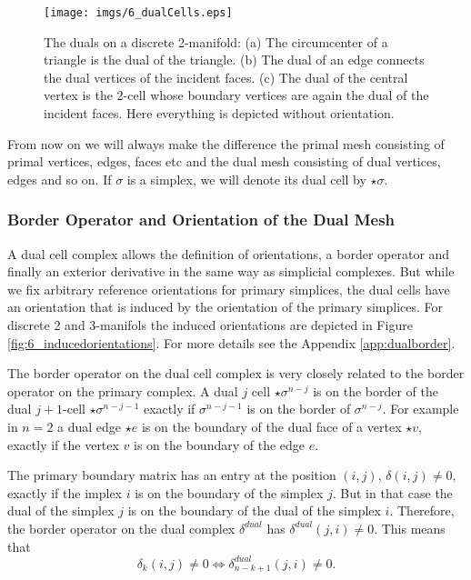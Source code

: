 \begin{figure}%
\begin{center}
\texttt{[image: imgs/6\_dualCells.eps]}%
\end{center}
\caption{The duals on a discrete 2-manifold: (a) The circumcenter of a triangle is the dual of the triangle. (b) The dual of an edge connects the dual vertices of the incident faces. (c) The dual of the central vertex is the 2-cell whose boundary vertices are again the dual of the incident faces. Here everything is depicted without orientation.}%
\label{fig:6_dualsimplice}%
\end{figure}


From now on we will always make the difference the primal mesh consisting of primal vertices, edges, faces etc and the dual mesh consisting of dual vertices, edges and so on. If $\sigma$ is a simplex, we will denote its dual cell by $\star \sigma$.


\subsubsection{Border Operator and Orientation of the Dual Mesh}
A dual cell complex allows the definition of orientations, a border operator and finally an exterior derivative in the same way as simplicial complexes. But while we fix arbitrary reference orientations for primary simplices, the dual cells have an orientation that is induced by the orientation of the primary simplices. For discrete 2 and 3-manifols the induced orientations are depicted in Figure \ref{fig:6_inducedorientations}. For more details see the Appendix \ref{app:dualborder}.  

The border operator on the dual cell complex is very closely related to the border operator on the primary complex. A dual $j$ cell $\star \sigma^{n-j}$ is on the border of the dual $j+1$-cell $\star \sigma^{n-j-1}$ exactly if $\sigma^{n-j-1}$ is on the border of $\sigma^{n-j}$. For example in $n=2$ a dual edge $\star e$ is on the boundary of the dual face of a vertex $\star v$, exactly if the vertex $v$ is on the boundary of the edge $e$. 

The primary boundary matrix has an entry at the position $(i,j)$, $\delta(i,j) \neq 0$, exactly if the implex $i$ is on the boundary of the simplex $j$. But in that case the dual of the simplex $j$ is on the boundary of the dual of the simplex $i$. Therefore, the border operator on the dual complex $\delta^{dual}$ has $\delta^{dual}(j,i) \neq 0$. This means that
\[\delta_k(i,j) \neq 0 \Leftrightarrow \delta_{n-k+1}^{dual}(j,i) \neq 0.\]

